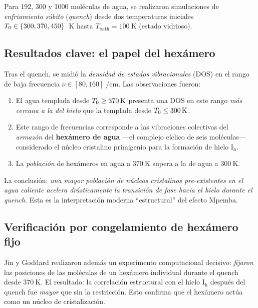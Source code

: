 \noindent Para 192, 300 y 1000 moléculas de agua, se realizaron simulaciones de 
\emph{enfriamiento súbito} (\emph{quench}) desde dos temperaturas iniciales 
$T_{0} \in \{300, 370, 450\}$~\si{\kelvin} hasta $T_{\mathrm{bath}} = \SI{100}{\kelvin}$ 
(estado vidrioso).

\subsection{Resultados clave: el papel del hexámero}

Tras el quench, se midió la \emph{densidad de estados vibracionales} (DOS) en el 
rango de baja frecuencia $\nu \in [80, 160]\;\si{\per\centi\meter}$. Las 
observaciones fueron:

\begin{enumerate}
\item El agua templada desde $T_{0} \geq \SI{370}{\kelvin}$ presenta una DOS en 
este rango \emph{más cercana a la del hielo} que la templada desde $T_{0} \leq \SI{300}{\kelvin}$.
\item Este rango de frecuencias corresponde a las vibraciones colectivas del 
\emph{armazón} del \textbf{hexámero de agua} ---el complejo cíclico de seis 
moléculas--- considerado el núcleo cristalino primigenio para la formación de 
hielo $\mathrm{I_h}$.
\item La \emph{población} de hexámeros en agua a $\SI{370}{\kelvin}$ supera a la 
de agua a $\SI{300}{\kelvin}$.
\end{enumerate}

\noindent La conclusión: \emph{una mayor población de núcleos cristalinos 
pre-existentes en el agua caliente acelera drásticamente la transición de fase 
hacia el hielo durante el quench.} Esta es la interpretación moderna ``estructural'' 
del efecto Mpemba.

\subsection{Verificación por congelamiento de hexámero fijo}

Jin y Goddard realizaron además un experimento computacional decisivo: 
\emph{fijaron} las posiciones de las moléculas de un hexámero individual durante 
el quench desde $\SI{370}{\kelvin}$. El resultado: la correlación estructural con 
el hielo $\mathrm{I_h}$ después del quench fue \emph{mayor} que sin la 
restricción. Esto confirma que el hexámero actúa como un núcleo de cristalización.

